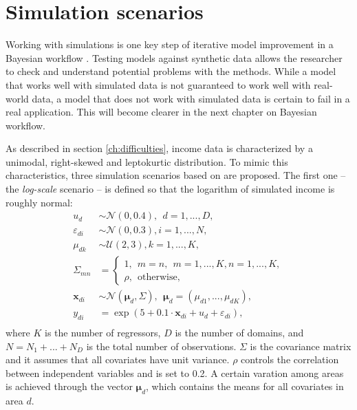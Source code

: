 \section{Simulation scenarios}
\label{ch:simulations}
Working with simulations is one key step of iterative model improvement in a Bayesian workflow \citep{gelman_bayesian_2020}.
Testing models against synthetic data allows the researcher to check and understand potential problems with the methods.
While a model that works well with simulated data is not guaranteed to work well with real-world data,
a model that does not work with simulated data is certain to fail in a real application.
This will become clearer in the next chapter on Bayesian workflow.

As described in section \ref{ch:difficulties}, income data is characterized by a unimodal, right-skewed and leptokurtic distribution.
To mimic this characteristics, three simulation scenarios based on \cite{rojas_perilla_data_2020} are proposed.
The first one – the \textit{log-scale} scenario – is defined so that the logarithm of simulated income is roughly normal:
\begin{equation}
    \begin{split}
        u_d & \sim \mathcal N(0, 0.4), ~~ d = 1,...,D,\\
        \varepsilon_{di} & \sim \mathcal{N}(0, 0.3), i = 1,...,N,\\
        \mu_{dk} & \sim \mathcal{U}(2, 3), k = 1,...,K,\\
        \Sigma_{mn} & = \begin{cases} 1, ~~ m = n,~~m = 1,...,K, n = 1,...,K, \\ \rho,  ~~ \text{otherwise},  \end{cases}
            \\
        \boldsymbol x_{di}  &\sim \mathcal N (\boldsymbol \mu_{d}, \Sigma) ,
            ~~ \boldsymbol \mu_{d} = (\mu_{d1}, ..., \mu_{dK}),\\
        y_{di} & = \exp(5 + 0.1 \cdot \boldsymbol x_{di}  + u_d + \varepsilon_{di}),\\
    \end{split}
    \label{eq:log_scenario}
\end{equation}
where $K$ is the number of regressors, $D$ is the number of domains, and $N = N_1 + ... + N_D$ is the total number of observations.
$\Sigma$ is the covariance matrix and it assumes that all covariates have unit variance. $\rho$ controls the correlation between independent variables and is set to 0.2.
A certain varation among areas is achieved through the vector $\boldsymbol \mu_d$, which contains the means for all covariates in area $d$.
